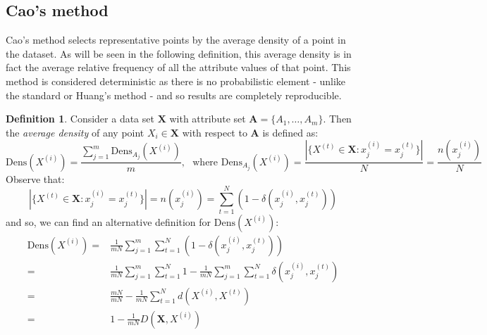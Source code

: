 \documentclass{article}
\theoremstyle{definition}
\newtheorem{definition}{Definition}[section]
\begin{document}
\subsection{Cao's method}\label{subsection:cao}

Cao's method selects representative points by the average density of a point in
the dataset. As will be seen in the following definition, this average density 
is in fact the average relative frequency of all the attribute values of that 
point. This method is considered deterministic as there is no probabilistic 
element - unlike the standard or Huang's method - and so results are completely
reproducible.


\begin{definition}\label{def:density}	
	Consider a data set $\textbf{X}$ with attribute set $\textbf{A} = 
	\{A_1, \ldots, A_m\}$. Then the \emph{average density} of any point 
	$X_i \in \textbf{X}$ with respect to $\textbf{A}$ is defined \cite{Cao09} 
    as:
	\[
	\text{Dens}(X^{(i)}) = \frac{\sum_{j=1}^m 
		\text{Dens}_{A_j}(X^{(i)})}{m}, \ \ \ 
		\text{where \ Dens}_{A_j}(X^{(i)}) = 
		\frac{|\{X^{(t)} \in \textbf{X} : x_j^{(i)} = x_j^{(t)}\}|}{N} = 
		\frac{n(x_j^{(i)})}{N}
	\]
	Observe that:
	\[
	|\{X^{(t)} \in \textbf{X} : x_j^{(i)} = x_j^{(t)}\}| = n(x_j^{(i)}) = 
		\sum_{t=1}^N (1 - \delta(x_j^{(i)}, x_j^{(t)}))
	\]	
	and so, we can find an alternative definition for 
	$\text{Dens}(X^{(i)})$:
	\begin{equation}
	    \begin{aligned}
	        \text{Dens}(X^{(i)}) = {} & {} \frac{1}{mN} \sum_{j=1}^m 
	                                       \sum_{t=1}^N 
                                           (1 - \delta(x_j^{(i)}, x_j^{(t)})) \\
			                     = {} & {} \frac{1}{mN} \sum_{j=1}^m 
                                           \sum_{t=1}^N 1 - \frac{1}{mN} 
                                           \sum_{j=1}^m \sum_{t=1}^N 
                                           \delta(x_j^{(i)}, x_j^{(t)}) \\
      			                 = {} & {} \frac{mN}{mN} - \frac{1}{mN} 
                                           \sum_{t=1}^N d(X^{(i)}, X^{(t)}) \\
			                     = {} & {} 1 - \frac{1}{mN} 
                                           D(\textbf{X}, X^{(i)})
	    \end{aligned}
	\end{equation}
\end{definition}	
\end{document}

